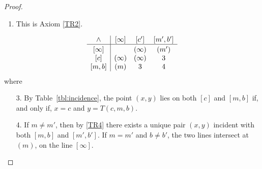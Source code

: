 \begin{proof}
\begin{description}[font=\normalfont\small\scshape]
\begin{enumerate}
            \item This is Axiom \ref{TR2}.
        \end{enumerate}

        \item[Axiom p$_2$:]
        $$
            \begin{array}{c|ccc}
                \wedge& {[\infty]} & {[c']} & {[m',b']}\\
                \hline\rule{0pt}{10pt}
                {[\infty]} &&{(\infty)}&{(m')} \\
                {[c]} &{(\infty)} &{(\infty)}&3\\
                {[m,b]} &{(m)} &3 &4
            \end{array}
        $$
        where
        \begin{enumerate}
            \item[3.] By Table~\eqref{tbl:incidence}, the point $(x,y)$ lies on both $[c]$ and $[m,b]$ if, and only if, $x=c$ and $y=T(c,m,b)$.

            \item[4.] If $m\ne m'$, then by \ref{TR4} there exists a unique pair $(x,y)$ incident with both $[m,b]$ and $[m',b']$. If $m=m'$ and $b\ne b'$, the two lines intersect at $(m)$, on the line $[\infty]$.


\end{enumerate}
\end{description}
\end{proof}
